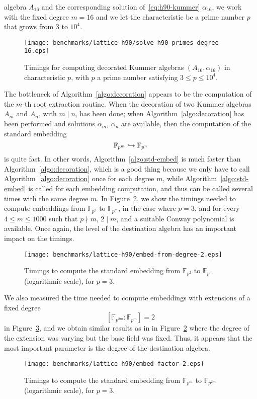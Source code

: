 algebra $A_{16}$ and the corresponding solution of~\eqref{eq:h90-kummer}
$\alpha_{16}$, \ie we work with the fixed degree $m=16$ and we let the
characteristic be a prime number $p$ that grows from $3$ to $10^4$.
\begin{figure}
  \centering
  \texttt{[image: benchmarks/lattice-h90/solve-h90-primes-degree-16.eps]}
  \caption{Timings for computing decorated Kummer algebras $(A_{16},
  \alpha_{16})$ in characteristic $p$, with $p$ a prime number satisfying $3\leq
  p\leq 10^4$.}
  \label{fig:degree-16}
\end{figure}
The bottleneck of Algorithm~\ref{algo:decoration} appears to be the computation
of the $m$-th root extraction routine. When the decoration of two Kummer
algebras $A_m$ and $A_n$, with $m\mid n$, has been done; \ie when
Algorithm~\ref{algo:decoration} has been performed and solutions $\alpha_m$,
$\alpha_n$ are available, then the computation of the standard embedding
\[
  \mathbb{F}_{p^m}\hookrightarrow\mathbb{F}_{p^n}
\]
is quite fast. In other words, Algorithm~\ref{algo:std-embed} is much faster
than Algorithm~\ref{algo:decoration}, which is a good thing because we only have
to call Algorithm~\ref{algo:decoration} once for each degree $m$, while
Algorithm~\ref{algo:std-embed} is called for each embedding computation, and
thus can be called several times with the same degree $m$. In
Figure~\ref{fig:embed-from-2}, we show the timings needed to compute embeddings
from $\mathbb{F}_{p^2}$ to $\mathbb{F}_{p^m}$, in the case where $p=3$, and for
every $4\leq m\leq 1000$ such that $p\nmid m$, $2\mid m$, and a suitable Conway
polynomial is available. Once again, the level of the destination algebra has an
important impact on the timings. 
\begin{figure}
  \centering
  \texttt{[image: benchmarks/lattice-h90/embed-from-degree-2.eps]}
  \caption{Timings to compute the standard embedding from $\mathbb{F}_{p^2}$ to
  $\mathbb{F}_{p^m}$ (logarithmic scale), for $p=3$.}
  \label{fig:embed-from-2}
\end{figure}
We also measured the time needed to compute embeddings with extensions of a
fixed degree
\[
  \left[ \mathbb{F}_{p^{2m}}:\mathbb{F}_{p^m} \right] = 2
\]
in Figure~\ref{fig:embed-factor-2}, and we obtain similar results as in in
Figure~\ref{fig:embed-from-2} where the degree of the extension was varying but
the base field was fixed. Thus, it appears that the most important parameter
is the degree of the destination algebra.
\begin{figure}
  \centering
  \texttt{[image: benchmarks/lattice-h90/embed-factor-2.eps]}
  \caption{Timings to compute the standard embedding from $\mathbb{F}_{p^m}$ to
  $\mathbb{F}_{p^{2m}}$ (logarithmic scale), for $p=3$.}
  \label{fig:embed-factor-2}
\end{figure}
